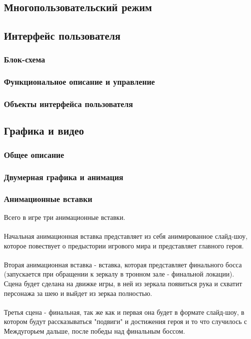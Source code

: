 \documentclass{article}
\begin{document}
\subsection{Многопользовательский режим}


\subsection{Интерфейс пользователя}
\subsubsection{Блок-схема}


\subsubsection{Функциональное описание и управление}


\subsubsection{Объекты интерфейса пользователя}


\subsection{Графика и видео}
\subsubsection{Общее описание}


\subsubsection{Двумерная графика и анимация}

\subsubsection{Анимационные вставки}
Всего в игре три анимационные вставки.
\\\\
Начальная анимационная вставка представляет из себя анимированное слайд-шоу, которое повествует о предыстории игрового мира и представляет главного героя.
\\\\
Вторая анимационная вставка - вставка, которая представляет финального босса (запускается при обращении к зеркалу в тронном зале - финальной локации). Сцена будет сделана на движке игры, в ней из зеркала появиться рука и схватит персонажа за шею и выйдет из зеркаа полностью.
\\\\
Третья сцена - финальная, так же как и первая она будет в формате слайд-шоу, в котором будут рассказываться "подвиги" и достижения героя и то что случилось с Междугорьем дальше, после победы над финальным боссом.
\end{document}
